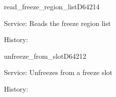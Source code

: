 \begin{hyppotrap}{read\_freeze\_region\_list}{D642}{14}
\item [Service:]
  Reads the freeze region list
\item [History:]
\end{hyppotrap}


\begin{hyppotrap}{unfreeze\_from\_slot}{D642}{12}
\item [Service:]
  Unfreezes from a freeze slot
\item [History:]
\end{hyppotrap}

